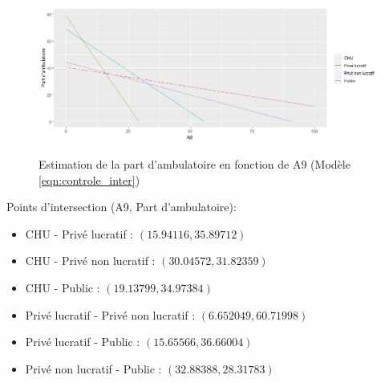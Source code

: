 \bigskip

\begin{figure}[!ht]
    \centering
    \caption{Estimation de la part d'ambulatoire en fonction de A9 (Modèle \ref{eqn:controle_inter})}
    \label{courbe_inter}
    \includegraphics[scale=0.7]{Images/A9_inter_c.jpeg}
    \label{inter_A9_c}
\end{figure}


Points d'intersection (A9, Part d'ambulatoire):

\begin{itemize}
    \item CHU - Privé lucratif : $(15.94116,35.89712)$
    \item CHU - Privé non lucratif : $(30.04572,31.82359)$
    \item CHU - Public : $(19.13799,34.97384)$
    \item Privé lucratif - Privé non lucratif : $(6.652049,60.71998)$
    \item Privé lucratif - Public : $(15.65566,36.66004)$
    \item Privé non lucratif - Public : $(32.88388,28.31783)$
\end{itemize}


